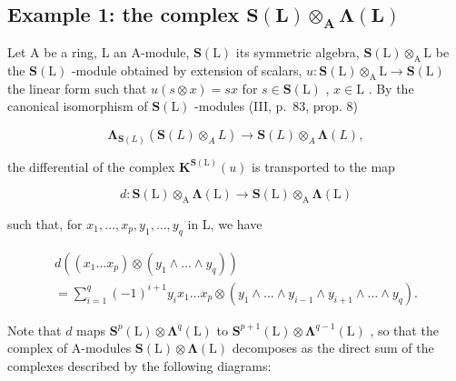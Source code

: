 \subsection{\texorpdfstring{Example 1: the complex \(\mathbf{S}(\mathbf{L})\otimes_{\mathbf{A}}\boldsymbol{\Lambda}(\mathbf{L})\)}{Example 1: the complex \textbackslash mathbf\{S\}(\textbackslash mathbf\{L\})\textbackslash otimes\_\{\textbackslash mathbf\{A\}\}\textbackslash boldsymbol\{\textbackslash Lambda\}(\textbackslash mathbf\{L\})}}

Let A be a ring, L an A-module, \(\mathbf{S}(\mathrm{L})\) its symmetric algebra, \(\mathbf{S}(\mathrm{L}) \otimes_{\mathrm{A}} \mathrm{L}\) be the \(\mathbf{S}(\mathrm{L})\) -module obtained by extension of scalars, \(u: \mathbf{S}(\mathrm{L}) \otimes_{\mathrm{A}} \mathrm{L} \to \mathbf{S}(\mathrm{L})\) the linear form such that \(u(s \otimes x) = sx\) for \(s \in \mathbf{S}(\mathrm{L})\) , \(x \in \mathrm{L}\) . By the canonical isomorphism of \(\mathbf{S}(\mathrm{L})\) -modules (III, p.~83, prop. 8)

\[
\boldsymbol {\Lambda} _ {\mathbf {S} (L)} (\mathbf {S} (L) \otimes_ {A} L) \rightarrow \mathbf {S} (L) \otimes_ {A} \boldsymbol {\Lambda} (L),
\]

the differential of the complex \(\mathbf{K}^{\mathbf{S}(\mathrm{L})}(u)\) is transported to the map

\[
d: \mathbf {S} (\mathrm{L}) \otimes_ {\mathrm{A}} \boldsymbol {\Lambda} (\mathrm{L}) \rightarrow \mathbf {S} (\mathrm{L}) \otimes_ {\mathrm{A}} \boldsymbol {\Lambda} (\mathrm{L})
\]

such that, for \(x_{1},\ldots,x_{p},y_{1},\ldots,y_{q}\) in L, we have

\[
\begin{array}{l} d \left(\left(x _ {1} \dots x _ {p}\right) \otimes \left(y _ {1} \wedge \dots \wedge y _ {q}\right)\right) \\ = \sum_ {i = 1} ^ {q} (- 1) ^ {i + 1} y _ {i} x _ {1} \dots x _ {p} \otimes \left(y _ {1} \wedge \dots \wedge y _ {i - 1} \wedge y _ {i + 1} \wedge \dots \wedge y _ {q}\right). \end{array}
\]

Note that \(d\) maps \(\mathbf{S}^{p}(\mathrm{L})\otimes\symbf{\Lambda}^{q}(\mathrm{L})\) to \(\mathbf{S}^{p+1}(\mathrm{L})\otimes\symbf{\Lambda}^{q-1}(\mathrm{L})\) , so that the complex of A-modules \(\mathbf{S}(\mathrm{L})\otimes\symbf{\Lambda}(\mathrm{L})\) decomposes as the direct sum of the complexes described by the following diagrams:

